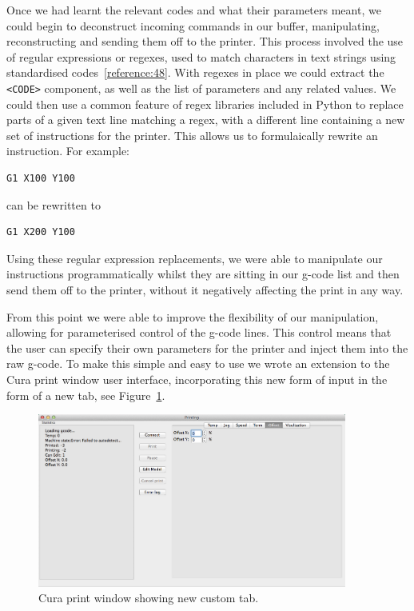 \documentclass[11pt]{report} %
\begin{document}
Once we had learnt the relevant codes and what their parameters meant, we could begin to deconstruct incoming commands in our buffer, manipulating, reconstructing and sending them off to the printer. This process involved the use of regular expressions or regexes, used to match characters in text strings using standardised codes~\ref{reference:48}. With regexes in place we could extract the \verb|<CODE>| component, as well as the list of parameters and any related values. We could then use a common feature of regex libraries included in Python to replace parts of a given text line matching a regex, with a different line containing a new set of instructions for the printer. This allows us to formulaically rewrite an instruction. For example:
\begin{verbatim}
G1 X100 Y100
\end{verbatim}
can be rewritten to
\begin{verbatim}
G1 X200 Y100
\end{verbatim}

Using these regular expression replacements, we were able to manipulate our instructions programmatically whilst they are sitting in our g-code list and then send them off to the printer, without it negatively affecting the print in any way.

	From this point we were able to improve the flexibility of our manipulation, allowing for parameterised control of the g-code lines. This control means that the user can specify their own parameters for the printer and inject them into the raw g-code. 
To make this simple and easy to use we wrote an extension to the Cura print window user interface, incorporating this new form of input in the form of a new tab, see Figure~\ref{figure:CuraCustomTab}.

\begin{figure}[H]
  \centering
  \includegraphics[width=4in]{CuraCustomTab.png}
  \caption{Cura print window showing new custom tab.}
  \label{figure:CuraCustomTab}
\end{figure}
\end{document}
